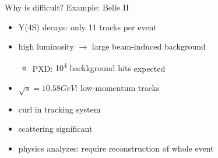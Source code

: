 \documentclass[presentation]{etp-beamer-fancy}
\begin{document}
\begin{frame}[label={sec:org32d6934}]{Why is difficult? Example: Belle II}
\begin{itemize}
\item Y(4S) decays: only \alert{11 tracks} per event
\item high luminosity \(\rightarrow\) large beam-induced background
\begin{itemize}
\item PXD: \alert{10\textsuperscript{4} backkground hits} expected
\end{itemize}
\item \(\sqrt{s} = 10.58 GeV\): \alert{low-momentum} tracks
\item curl in tracking system
\item scattering significant
\item physics analyzes: require reconstruction of whole event
\end{itemize}
\end{frame}
\end{document}
